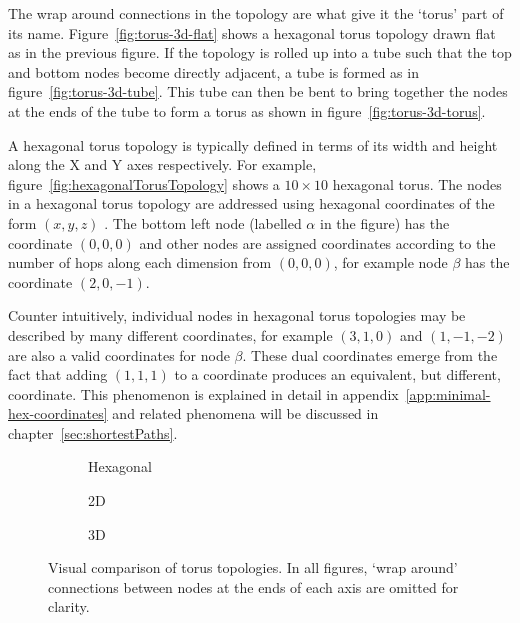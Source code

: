 		The wrap around connections in the topology are what give it the `torus'
		part of its name. Figure~\ref{fig:torus-3d-flat} shows a hexagonal torus
		topology drawn flat as in the previous figure. If the topology is rolled up
		into a tube such that the top and bottom nodes become directly adjacent, a
		tube is formed as in figure~\ref{fig:torus-3d-tube}. This tube can then be
		bent to bring together the nodes at the ends of the tube to form a torus as
		shown in figure~\ref{fig:torus-3d-torus}.
		
		A hexagonal torus topology is typically defined in terms of its width and
		height along the X and Y axes respectively. For example,
		figure~\ref{fig:hexagonalTorusTopology} shows a $10\times10$ hexagonal
		torus.  The nodes in a hexagonal torus topology are addressed using
		hexagonal coordinates of the form $(x, y, z)$ \cite{patel15}. The bottom
		left node (labelled $\alpha$ in the figure) has the coordinate $(0, 0, 0)$
		and other nodes are assigned coordinates according to the number of hops
		along each dimension from $(0, 0, 0)$, for example node $\beta$ has the
		coordinate $(2, 0, -1)$.
		
		Counter intuitively, individual nodes in hexagonal torus topologies may be
		described by many different coordinates, for example $(3, 1, 0)$ and $(1,
		-1, -2)$ are also a valid coordinates for node $\beta$. These dual
		coordinates emerge from the fact that adding $(1, 1, 1)$ to a coordinate
		produces an equivalent, but different, coordinate. This phenomenon is
		explained in detail in appendix~\ref{app:minimal-hex-coordinates} and
		related phenomena will be discussed in chapter~\ref{sec:shortestPaths}.
		
		\begin{figure}
			\center
			\begin{subfigure}[b]{0.32\linewidth}
				\center
				
				\caption{Hexagonal}
				\label{fig:torus-compare-hexagonal}
			\end{subfigure}
			\begin{subfigure}[b]{0.32\linewidth}
				\center
				
				\caption{2D}
				\label{fig:torus-compare-2d}
			\end{subfigure}
			\begin{subfigure}[b]{0.32\linewidth}
				\center
				
				\caption{3D}
				\label{fig:torus-compare-3d}
			\end{subfigure}
			
			\caption[Visual comparison of torus topologies.]%
			{Visual comparison of torus topologies. In all figures, `wrap
			around' connections between nodes at the ends of each axis are omitted
			for clarity.}
			\label{fig:torus-compare}
		\end{figure}
		
